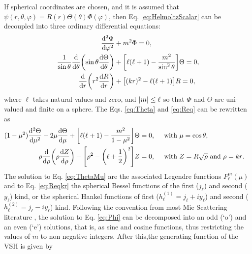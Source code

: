 If spherical coordinates are chosen, and it is assumed that $\psi(r,\theta,\varphi) = R(r)\Theta(\theta)\Phi(\varphi)$, then Eq. \eqref{eq:HelmoltzScalar} can be decoupled into three ordinary differential equations:
%
 \begin{align}
	\dv[2]{\Phi}{\varphi} &+ m^2 \Phi =0,
 		\label{eq:Phi}\\
	\frac{1}{\sin\theta}\dv{\theta}\qty(\sin\theta\dv{\Theta}{\theta}) &+ \qty[\ell(\ell+1)- \frac{m^2}{\sin^2\theta}]\Theta =0,
		\label{eq:Theta}\\
	\dv{r}\qty(r^2\dv{R}{r}) &+ \qty[ (k r)^2 - \ell (\ell +1)] R =0,
 		\label{eq:Req}
\end{align}
%
where $\ell$ takes natural values and zero, and $\abs{m}\leq \ell$ so that $\Phi$ and $\Theta$ are uni-valued and finite on a sphere. The Eqs. \eqref{eq:Theta} and \eqref{eq:Req} can be rewritten as
%
 \begin{align}
(1-\mu^2)\dv[2]{\Theta}{\mu} - 2\mu\dv{\Theta}{\mu} + \qty[\ell(\ell+1)-\frac{m^2}{1-\mu^2}]\Theta &= 0, \qqtext{ with $\mu = \cos\theta$,}
	\label{eq:ThetaMu}\\
	\rho\dv{\rho}\qty(\rho\dv{Z}{\rho}) +  \qty[\rho^2 - \qty(\ell + \frac12)^2]Z  &= 0,  \qqtext{ with $Z = R\sqrt{\rho}$ and $\rho = kr$.}
\label{eq:Reqkr}
\end{align}
%
The solution to Eq. \eqref{eq:ThetaMu} are the associated Legendre functions $ P_\ell^m(\mu)$ and to Eq. \eqref{eq:Reqkr} the spherical Bessel functions of the first ($j_\ell$)  and second ($y_\ell$) kind, or the spherical Hankel functions of first ($h_\ell^{(1)} = j_\ell + iy_\ell$) and second ($h_\ell^{(2)} = j_\ell - iy_\ell$)  kind. Following the convention from most Mie Scattering literature \cite{zangwill_modern_2013}, the solution to Eq. \eqref{eq:Phi} can be decomposed into an odd (`o') and an even (`e') solutions, that is, as sine and cosine functions, thus restricting the values of $m$ to non negative integers. After this,the generating function of the VSH is given by
%
%
%
%
%

